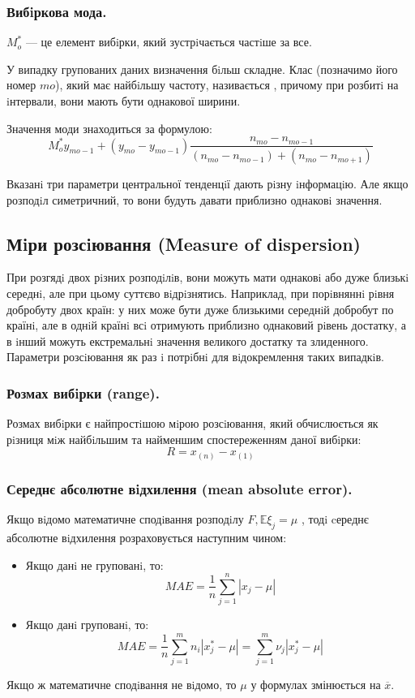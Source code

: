 \subsubsection{Вибiркова мода.}
 $M_o^*$ --- це елемент вибiрки, який зустрiчається частiше за все.\par

У випадку групованих даних визначення бiльш складне. Клас (позначимо його номер $mo$), який має найбiльшу частоту, називається , причому при розбитi на iнтервали, вони
мають бути однакової ширини.\par
Значення моди знаходиться за формулою:
$$
M_{o}^* y_{mo-1} + (y_{mo} - y_{mo-1}) \frac{n_{mo} - n_{mo-1}}{(n_{mo} - n_{mo-1}) + (n_{mo} - n_{mo+1})}
$$
\begin{remark}
Вказанi три параметри центральної тенденцiї дають рiзну iнформацiю. Але якщо розподiл
симетричний, то вони будуть давати приблизно однаковi значення.
\end{remark}
\newpage
\subsection{Мiри розсiювання (Measure of dispersion)}
При розгядi двох рiзних розподiлiв, вони можуть мати однаковi або дуже близькi середнi, але
при цьому суттєво вiдрiзнятись. Наприклад, при порiвняннi рiвня добробуту двох країн: у них
може бути дуже близькими середнiй добробут по країнi, але в однiй країнi всi отримують
приблизно однаковий рiвень достатку, а в iнший можуть екстремальнi значення великого
достатку та злиденного. Параметри розсiювання як раз i потрiбнi для вiдокремлення таких
випадкiв.
\subsubsection{Розмах вибiрки (range).}
Розмах вибiрки є найпростiшою мiрою розсiювання, який обчислюється як рiзниця мiж найбiльшим та найменшим спостереженням даної вибiрки:
$$
R = x_{(n)} - x_{(1)}
$$
\subsubsection{Середнє абсолютне вiдхилення (mean absolute error).}
Якщо вiдомо математичне сподiвання розподiлу $F, \mathbb{E} \xi_j = \mu$ , тодi cереднє абсолютне вiдхилення розраховується наступним чином:

\begin{itemize}
    \item Якщо данi не групованi, то:
    $$
    MAE = \frac{1}{n}  \sum\limits_{j = 1}^{n}{\left| x_j - \mu \right|}
    $$
    \item Якщо данi групованi, то:
    $$
    MAE = \frac{1}{n}  \sum\limits_{j = 1}^{m}{n_i \left| x^*_j - \mu \right|} =  \sum\limits_{j =1 }^{m}{ \nu_j \left| x_j^* - \mu \right|}
    $$
\end{itemize}
Якщо ж математичне сподiвання не вiдомо, то $\mu$ у формулах змінюється на $\overline{x}$.
